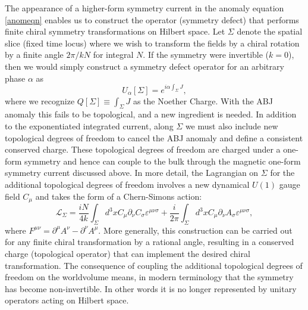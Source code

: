 \documentclass[11pt,a4paper]{article}
\begin{document}
The appearance of a higher-form symmetry current in the anomaly equation \eqref{anomeqn} enables us to construct the operator (symmetry defect) that performs finite chiral symmetry transformations on Hilbert space.  Let $\Sigma$ denote the spatial slice (fixed time locus) where we wish to transform the fields by a chiral rotation by a finite angle $2\pi/kN$ for integral $N$. 
If the symmetry were invertible ($k=0$), then we would simply construct a symmetry defect operator for an arbitrary phase $\alpha$ as
\begin{equation}
    U_{\alpha}[\Sigma]= e^{i\alpha \int_{\Sigma} J},
\end{equation}
where we recognize $Q[\Sigma] \equiv \int_{\Sigma} J$ as the Noether Charge. With the ABJ anomaly this fails to be topological, and a new ingredient is needed. In addition to the exponentiated integrated current, along $\Sigma$ we must also include new topological degrees of freedom to cancel the ABJ anomaly and define a consistent conserved charge.  These topological degrees of freedom are charged under a one-form symmetry and hence can couple to the bulk through the magnetic one-form symmetry current discussed above.  In more detail, the Lagrangian on $\Sigma$ for the additional topological degrees of freedom involves a new dynamical $U(1)$ gauge field $C_{\mu}$ and takes the form of a Chern-Simons action:
\begin{equation}
    \mathcal{L}_{\Sigma}=\frac{iN}{4k}\int_{\Sigma}d^{3}x C_{\mu}\partial_{\nu}C_{\sigma}\varepsilon^{\mu\nu\sigma}+\frac{i}{2\pi}\int_{\Sigma}d^{3}x C_{\mu}\partial_{\nu}A_{\sigma}\varepsilon^{\mu\nu\sigma},
\end{equation}
where $F^{\mu\nu} = \partial^\mu A^\nu - \partial^\nu A^\mu$.
More generally, this construction can be carried out for any finite chiral transformation by a rational angle, resulting in a conserved charge (topological operator) that can implement the desired chiral transformation.  The consequence of coupling the additional topological degrees of freedom on the worldvolume means, in modern terminology that the symmetry has become non-invertible.  In other words it is no longer represented by unitary operators acting on Hilbert space.
\end{document}
